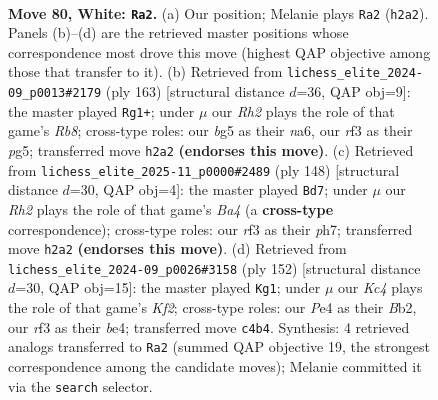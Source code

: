 \documentclass[11pt]{article}
\begin{document}
\clearpage

\begin{figure}[p]\centering
\begin{subfigure}{0.46\textwidth}\centering
\resizebox{\linewidth}{!}{%
\newchessgame
\chessboard[
  setfen={8/2B5/3pk2p/4p1b1/n1K1P2p/5r2/7R/8 w - - 2 80},
  showmover=false,
  pgfstyle=straightmove, color=movearrow, markmove={h2-a2}
]}
\caption{}
\end{subfigure}\hfill
\begin{subfigure}{0.46\textwidth}\centering
\resizebox{\linewidth}{!}{%
\newchessgame
\chessboard[
  setfen={8/8/N5p1/P3k1P1/1P5P/5PK1/8/1r6 b - - 0 82},
  showmover=false,
  pgfstyle=straightmove, color=movearrow, markmove={b1-g1}
]}
\caption{}
\end{subfigure}
\\[4pt]
\begin{subfigure}{0.46\textwidth}\centering
\resizebox{\linewidth}{!}{%
\newchessgame
\chessboard[
  setfen={8/7p/1b6/p3p1p1/B1Kp1k2/7P/8/8 w - - 4 75},
  showmover=false,
  pgfstyle=straightmove, color=movearrow, markmove={a4-d7}
]}
\caption{}
\end{subfigure}\hfill
\begin{subfigure}{0.46\textwidth}\centering
\resizebox{\linewidth}{!}{%
\newchessgame
\chessboard[
  setfen={8/8/R1nbk1p1/7p/4bp1P/8/1B3K2/8 w - - 0 77},
  showmover=false,
  pgfstyle=straightmove, color=movearrow, markmove={f2-g1}
]}
\caption{}
\end{subfigure}
\caption{\textbf{Move 80, White: \texttt{Ra2}.} (a) Our position; Melanie plays \texttt{Ra2} (\texttt{h2a2}). Panels (b)--(d) are the retrieved master positions whose correspondence most drove this move (highest QAP objective among those that transfer to it). (b) Retrieved from \texttt{lichess\_elite\_2024-09\_p0013\#2179} (ply 163) [structural distance $d$=36, QAP obj=9]: the master played \texttt{Rg1+}; under $\mu$ our \emph{Rh2} plays the role of that game's \emph{Rb8}; cross-type roles: our \emph{b}g5 as their \emph{n}a6, our \emph{r}f3 as their \emph{p}g5; transferred move \texttt{h2a2} \textbf{(endorses this move)}. (c) Retrieved from \texttt{lichess\_elite\_2025-11\_p0000\#2489} (ply 148) [structural distance $d$=30, QAP obj=4]: the master played \texttt{Bd7}; under $\mu$ our \emph{Rh2} plays the role of that game's \emph{Ba4} (a \textbf{cross-type} correspondence); cross-type roles: our \emph{r}f3 as their \emph{p}h7; transferred move \texttt{h2a2} \textbf{(endorses this move)}. (d) Retrieved from \texttt{lichess\_elite\_2024-09\_p0026\#3158} (ply 152) [structural distance $d$=30, QAP obj=15]: the master played \texttt{Kg1}; under $\mu$ our \emph{Kc4} plays the role of that game's \emph{Kf2}; cross-type roles: our \emph{P}e4 as their \emph{B}b2, our \emph{r}f3 as their \emph{b}e4; transferred move \texttt{c4b4}. Synthesis: 4 retrieved analogs transferred to \texttt{Ra2} (summed QAP objective 19, the strongest correspondence among the candidate moves); Melanie committed it via the \texttt{search} selector.}
\label{fig:thought-m158}
\end{figure}
\end{document}

